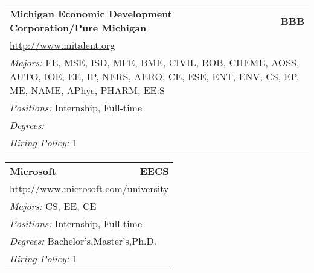\documentclass[twoside]{article}
\begin{document}
\begin{center}
\begin{multicols}{3}
\begin{FlushLeft}
\begin{minipage}{\columnwidth}
\end{minipage}
 
\begin{minipage}{\columnwidth}\begin{tabularx}{.95\columnwidth}{Xr}
                 {\Large\bf Michigan Economic Development Corporation/Pure Michigan} & {\Large\bf BBB}\\
    \multicolumn{2}{p{.95\columnwidth}}{\url{http://www.mitalent.org}}\\
    \multicolumn{2}{p{.95\columnwidth}}{\emph{Majors:} FE, MSE, ISD, MFE, BME, CIVIL, ROB, CHEME, AOSS, AUTO, IOE, EE, IP, NERS, AERO, CE, ESE, ENT, ENV, CS, EP, ME, NAME, APhys, PHARM, EE:S}\\
    \multicolumn{2}{p{.95\columnwidth}}{\emph{Positions:} Internship, Full-time}\\
    \multicolumn{2}{p{.95\columnwidth}}{\emph{Degrees:} }\\
    \multicolumn{2}{p{.95\columnwidth}}{\emph{Hiring Policy:} 1}\\
    \end{tabularx}
    
\end{minipage}
 
\begin{minipage}{\columnwidth}\begin{tabularx}{.95\columnwidth}{Xr}
                 {\Large\bf Microsoft} & {\Large\bf EECS}\\
    \multicolumn{2}{p{.95\columnwidth}}{\url{http://www.microsoft.com/university}}\\
    \multicolumn{2}{p{.95\columnwidth}}{\emph{Majors:} CS, EE, CE}\\
    \multicolumn{2}{p{.95\columnwidth}}{\emph{Positions:} Internship, Full-time}\\
    \multicolumn{2}{p{.95\columnwidth}}{\emph{Degrees:} Bachelor's,Master's,Ph.D.}\\
    \multicolumn{2}{p{.95\columnwidth}}{\emph{Hiring Policy:} 1}\\
    \end{tabularx}
    
\end{minipage}
 

\end{FlushLeft}
\end{multicols}
\end{center}
\end{document}
